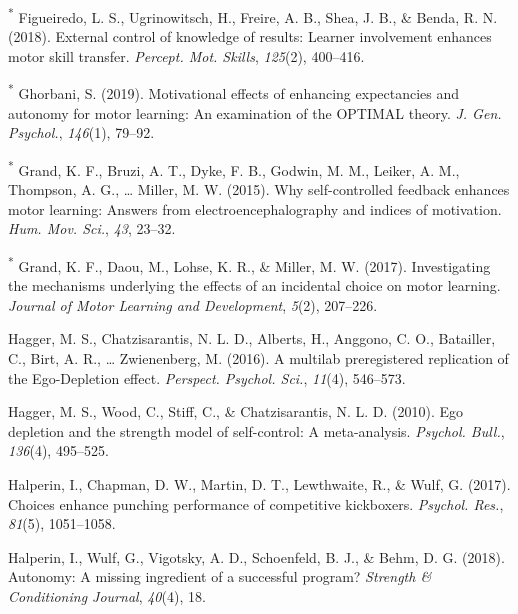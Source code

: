 \documentclass[
  english,
  man,floatsintext]{apa7}
\newlength{\cslhangindent}
\newlength{\cslentryspacingunit} %
\newenvironment{CSLReferences}[2] %
 {%
  \setlength{\parindent}{0pt}
  \ifodd #1
  \let\oldpar\par
  \def\par{\hangindent=\cslhangindent\oldpar}
  \fi
  \setlength{\parskip}{#2\cslentryspacingunit}
 }%
 {}
\begin{document}
\begin{CSLReferences}{1}{0}
\leavevmode{}%
\textsuperscript{*} Figueiredo, L. S., Ugrinowitsch, H., Freire, A. B., Shea, J. B., \& Benda, R. N. (2018). External control of knowledge of results: Learner involvement enhances motor skill transfer. \emph{Percept. Mot. Skills}, \emph{125}(2), 400--416.

\leavevmode{}%
\textsuperscript{*} Ghorbani, S. (2019). Motivational effects of enhancing expectancies and autonomy for motor learning: An examination of the {OPTIMAL} theory. \emph{J. Gen. Psychol.}, \emph{146}(1), 79--92.

\leavevmode{}%
\textsuperscript{*} Grand, K. F., Bruzi, A. T., Dyke, F. B., Godwin, M. M., Leiker, A. M., Thompson, A. G., \ldots{} Miller, M. W. (2015). Why self-controlled feedback enhances motor learning: Answers from electroencephalography and indices of motivation. \emph{Hum. Mov. Sci.}, \emph{43}, 23--32.

\leavevmode{}%
\textsuperscript{*} Grand, K. F., Daou, M., Lohse, K. R., \& Miller, M. W. (2017). Investigating the mechanisms underlying the effects of an incidental choice on motor learning. \emph{Journal of Motor Learning and Development}, \emph{5}(2), 207--226.

\leavevmode{}%
Hagger, M. S., Chatzisarantis, N. L. D., Alberts, H., Anggono, C. O., Batailler, C., Birt, A. R., \ldots{} Zwienenberg, M. (2016). A multilab preregistered replication of the {Ego-Depletion} effect. \emph{Perspect. Psychol. Sci.}, \emph{11}(4), 546--573.

\leavevmode{}%
Hagger, M. S., Wood, C., Stiff, C., \& Chatzisarantis, N. L. D. (2010). Ego depletion and the strength model of self-control: A meta-analysis. \emph{Psychol. Bull.}, \emph{136}(4), 495--525.

\leavevmode{}%
Halperin, I., Chapman, D. W., Martin, D. T., Lewthwaite, R., \& Wulf, G. (2017). Choices enhance punching performance of competitive kickboxers. \emph{Psychol. Res.}, \emph{81}(5), 1051--1058.

\leavevmode{}%
Halperin, I., Wulf, G., Vigotsky, A. D., Schoenfeld, B. J., \& Behm, D. G. (2018). Autonomy: A missing ingredient of a successful program? \emph{Strength \& Conditioning Journal}, \emph{40}(4), 18.


\end{CSLReferences}
\end{document}
